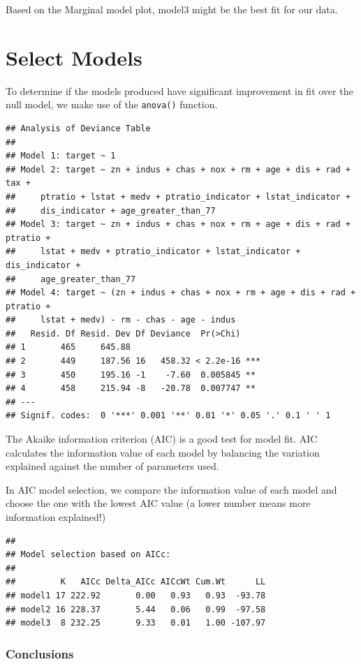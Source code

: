 \documentclass[3p]{elsarticle} %
\begin{document}
Based on the Marginal model plot, model3 might be the best fit for our
data.

\newpage

\hypertarget{select-models}{%
\section{Select Models}\label{select-models}}

To determine if the models produced have significant improvement in fit
over the null model, we make use of the \texttt{anova()} function.

\begin{verbatim}
## Analysis of Deviance Table
## 
## Model 1: target ~ 1
## Model 2: target ~ zn + indus + chas + nox + rm + age + dis + rad + tax + 
##     ptratio + lstat + medv + ptratio_indicator + lstat_indicator + 
##     dis_indicator + age_greater_than_77
## Model 3: target ~ zn + indus + chas + nox + rm + age + dis + rad + ptratio + 
##     lstat + medv + ptratio_indicator + lstat_indicator + dis_indicator + 
##     age_greater_than_77
## Model 4: target ~ (zn + indus + chas + nox + rm + age + dis + rad + ptratio + 
##     lstat + medv) - rm - chas - age - indus
##   Resid. Df Resid. Dev Df Deviance  Pr(>Chi)    
## 1       465     645.88                          
## 2       449     187.56 16   458.32 < 2.2e-16 ***
## 3       450     195.16 -1    -7.60  0.005845 ** 
## 4       458     215.94 -8   -20.78  0.007747 ** 
## ---
## Signif. codes:  0 '***' 0.001 '**' 0.01 '*' 0.05 '.' 0.1 ' ' 1
\end{verbatim}

The Akaike information criterion (AIC) is a good test for model fit. AIC
calculates the information value of each model by balancing the
variation explained against the number of parameters used.

In AIC model selection, we compare the information value of each model
and choose the one with the lowest AIC value (a lower number means more
information explained!)

\begin{verbatim}
## 
## Model selection based on AICc:
## 
##         K   AICc Delta_AICc AICcWt Cum.Wt      LL
## model1 17 222.92       0.00   0.93   0.93  -93.78
## model2 16 228.37       5.44   0.06   0.99  -97.58
## model3  8 232.25       9.33   0.01   1.00 -107.97
\end{verbatim}

\hypertarget{conclusions}{%
\subsubsection{Conclusions}\label{conclusions}}
\end{document}
